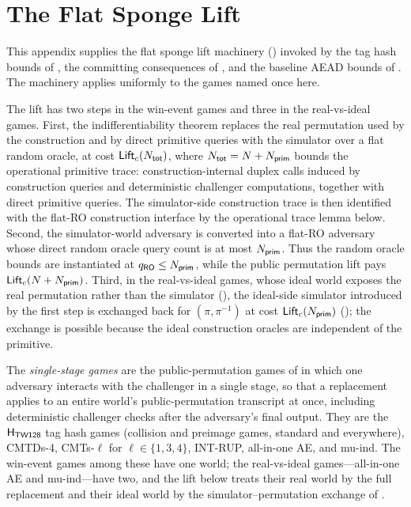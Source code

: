 \section{The Flat Sponge Lift}
\label{app:flat-sponge-lift}

This appendix supplies the flat sponge lift machinery
() invoked
by the tag hash bounds of , the committing
consequences of , and the baseline AEAD bounds of
. The machinery applies uniformly to the games named
once here.

The lift has two steps in the win-event games and three in the
real-vs-ideal games. First, the \cite{BDPV08} indifferentiability theorem
replaces the real permutation used by the \TW{} construction and by direct
primitive queries with the simulator over a flat random oracle, at cost
$\mathsf{Lift}_c(N_{\mathsf{tot}})$, where $N_{\mathsf{tot}} = N + N_{\mathsf{prim}}$ bounds the operational primitive
trace: construction-internal duplex calls induced by construction queries and
deterministic challenger computations, together with direct primitive queries.
The simulator-side construction trace is then identified with the flat-RO
construction interface by the operational trace lemma below.
Second, the simulator-world adversary is converted into a flat-RO
adversary whose direct random oracle query count is at most $N_{\mathsf{prim}}$. Thus the
random oracle bounds are instantiated at $q_{\mathsf{RO}} \leq N_{\mathsf{prim}}$, while the public
permutation lift pays $\mathsf{Lift}_c(N+N_{\mathsf{prim}})$. Third, in the real-vs-ideal games,
whose ideal world exposes the real permutation rather than the simulator
(), the ideal-side simulator introduced by the first step
is exchanged back for $(\pi,\pi^{-1})$ at cost $\mathsf{Lift}_c(N_{\mathsf{prim}})$
(); the exchange is possible because the ideal
construction oracles are independent of the primitive.

\begin{definition}
\label{def:single-stage-games}
The \emph{single-stage \TW{} games} are the public-permutation games of
 in which one
adversary interacts with the challenger in a single stage, so that a
\cite{BDPV08} replacement applies to an entire world's public-permutation
transcript at once, including deterministic challenger checks after the
adversary's final output. They are
the $\mathsf{H}_{\mathsf{TW128}}$ tag hash games (collision and preimage games, standard and
everywhere), CMTDs-4, CMTs-$\ell$ for $\ell \in \{1,3,4\}$,
\textsf{INT-RUP}, all-in-one AE, and mu-ind. The win-event games among these
have one world; the real-vs-ideal games---all-in-one AE and mu-ind---have two,
and the lift below treats their real world by the full replacement and their
ideal world by the simulator--permutation exchange of
.
\end{definition}

